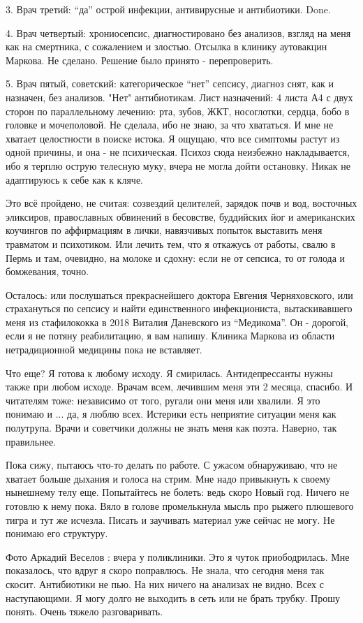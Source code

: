 3. Врач третий: \enquote{да} острой инфекции, антивирусные и антибиотики. Done.

4. Врач четвертый: хрониосепсис, диагностировано без анализов, взгляд на меня как на смертника, с сожалением и злостью. Отсылка в клинику аутовакцин Маркова. Не сделано. Решение было принято - перепроверить.

5. Врач пятый, советский: категорическое \enquote{нет} сепсису, диагноз снят, как и
назначен, без анализов. "Нет" антибиотикам. Лист назначений: 4 листа А4 с двух
сторон по параллельному лечению: рта, зубов, ЖКТ, носоглотки, сердца, бобо в
головке и мочеполовой. Не сделала, ибо не знаю, за что хвататься. И мне не
хватает целостности в поиске истока. Я ощущаю, что все симптомы растут из одной
причины, и она - не психическая. Психоз сюда неизбежно накладывается, ибо я
терплю острую телесную муку, вчера не могла дойти остановку. Никак не
адаптируюсь к себе как к кляче. 

Это всё пройдено, не считая: созвездий целителей, зарядок почв и вод, восточных
эликсиров, православных обвинений в бесовстве, буддийских йог и американских
коучингов по аффирмациям в лички, навязчивых попыток выставить меня травматом и
психотиком. Или лечить тем, что я откажусь от работы, свалю в Пермь и там,
очевидно, на молоке и сдохну: если не от сепсиса, то от голода и бомжевания,
точно. 

Осталось: или послушаться прекраснейшего доктора Евгения Черняховского,  или
страхануться по сепсису и найти единственного инфекциониста, вытаскивавшего
меня из стафилококка в 2018 Виталия Даневского из \enquote{Медикома}. Он - дорогой,
если я не потяну реабилитацию, я вам напишу. Клиника Маркова из области
нетрадиционной медицины пока не вставляет.

Что еще? Я готова к любому исходу. Я смирилась. Антидепрессанты нужны также при
любом исходе. Врачам всем, лечившим меня эти 2 месяца, спасибо. И читателям
тоже: независимо от того, ругали они меня или хвалили. Я это понимаю и ... да,
я люблю всех. Истерики есть неприятие ситуации меня как полутрупа. Врачи и
советчики должны не знать меня как поэта. Наверно, так правильнее. 

Пока сижу, пытаюсь что-то делать по работе. С ужасом обнаруживаю, что не
хватает больше дыхания и голоса на стрим. Мне надо привыкнуть к своему
нынешнему телу еще. Попытайтесь не болеть: ведь скоро Новый год. Ничего не
готовлю к нему пока. Вяло в голове промелькнула мысль про рыжего плюшевого
тигра и тут же исчезла. Писать и заучивать материал уже сейчас не могу. Не
понимаю его структуру.

Фото Аркадий Веселов : вчера у поликлиники. Это я чуток приободрилась. Мне
показалось, что вдруг я скоро поправлюсь. Не знала, что сегодня меня так
скосит. Антибиотики не пью. На них ничего на анализах не видно. Всех с
наступающими. Я могу долго не выходить в сеть или не брать трубку. Прошу
понять. Очень тяжело разговаривать.
